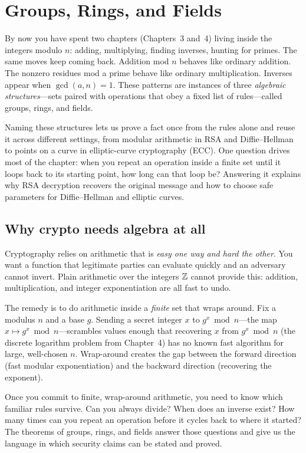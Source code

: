 \chapter{Groups, Rings, and Fields}

By now you have spent two chapters (Chapters~3 and~4) living inside the integers modulo $n$: adding, multiplying, finding inverses, hunting for primes. The same moves keep coming back. Addition mod $n$ behaves like ordinary addition. The nonzero residues mod a prime behave like ordinary multiplication. Inverses appear when $\gcd(a,n) = 1$. These patterns are instances of three \emph{algebraic structures}---sets paired with operations that obey a fixed list of rules---called groups, rings, and fields.

Naming these structures lets us prove a fact once from the rules alone and reuse it across different settings, from modular arithmetic in RSA and Diffie--Hellman to points on a curve in elliptic-curve cryptography (ECC). One question drives most of the chapter: when you repeat an operation inside a finite set until it loops back to its starting point, how long can that loop be? Answering it explains why RSA decryption recovers the original message and how to choose safe parameters for Diffie--Hellman and elliptic curves.

\chapterline

\section{Why crypto needs algebra at all}
\label{ch05:why-algebra}

Cryptography relies on arithmetic that is \emph{easy one way and hard the
other}. You want a function that legitimate parties can evaluate quickly and an
adversary cannot invert. Plain arithmetic over the integers $\mathbb{Z}$ cannot provide this: addition,
multiplication, and integer exponentiation are all fast to undo.

The remedy is to do arithmetic inside a \emph{finite} set that wraps around. Fix a modulus $n$ and a base $g$. Sending a secret integer $x$ to $g^x \bmod n$---the map $x \mapsto g^x \bmod n$---scrambles values enough that recovering $x$ from $g^x \bmod n$ (the discrete logarithm problem from Chapter~4) has no known fast algorithm for large, well-chosen $n$. Wrap-around creates the gap between the forward direction (fast modular exponentiation) and the backward direction (recovering the exponent).

Once you commit to finite, wrap-around arithmetic, you need to know which
familiar rules survive. Can you always divide? When does an inverse exist? How many
times can you repeat an operation before it cycles back to where it started? The theorems of groups,
rings, and fields answer those questions and give us the language in which security claims can be stated and proved.

